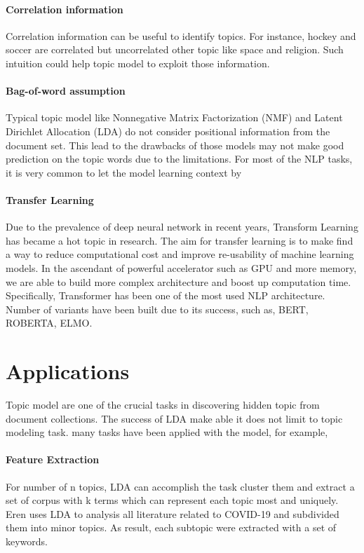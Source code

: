 \paragraph{Correlation information} Correlation information can be useful to identify topics. For instance, hockey and soccer are correlated but uncorrelated other topic like space and religion. Such intuition could help topic model to exploit those information. 
\paragraph{Bag-of-word assumption} Typical topic model like Nonnegative Matrix Factorization (NMF) \cite{paisley_bayesian_nodate} and Latent Dirichlet Allocation (LDA) \cite{blei_latent_2003} do not consider positional information from the document set. This lead to the drawbacks of those models may not make good prediction on the topic words due to the limitations. For most of the NLP tasks, it is very common to let the model learning context by
\paragraph{Transfer Learning} Due to the prevalence of deep neural network in recent years, Transform Learning has became a hot topic in research. The aim for transfer learning is to make find a way to reduce computational cost and improve re-usability of machine learning models. In the ascendant of powerful accelerator such as GPU and more memory, we are able to build more complex architecture and boost up computation time. Specifically, Transformer has been one of the most used NLP architecture. Number of variants have been built due to its success, such as, BERT, ROBERTA, ELMO.
\section{Applications}
Topic model are one of the crucial tasks in discovering hidden topic from document collections. The success of LDA make able it does not limit to topic modeling task. many tasks have been applied with the model, for example,
\paragraph{Feature Extraction}\label{AAA} For number of n topics, LDA can accomplish the task cluster them and extract a set of corpus with k terms which can represent each topic most and uniquely. Eren \cite{eren_covid-19_2020} uses LDA to analysis all literature related to COVID-19 and subdivided them into minor topics. As result, each subtopic were extracted with a set of keywords.
